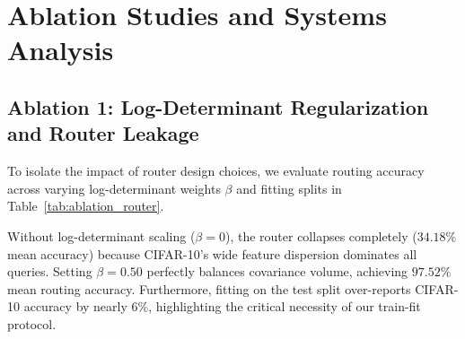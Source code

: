 \documentclass[11pt, a4paper]{article}
\begin{document}
\section{Ablation Studies and Systems Analysis}
\label{sec:ablations}

\subsection{Ablation 1: Log-Determinant Regularization and Router Leakage}

To isolate the impact of router design choices, we evaluate routing accuracy across varying log-determinant weights $\beta$ and fitting splits in Table~\ref{tab:ablation_router}.

\begin{table}[h]
\centering
\caption{\textbf{Router Calibration Ablation: Log-Determinant Weight $\beta$ and Fitting Split.} Evaluated on Stage 3 representations.}
\label{tab:ablation_router}
\small
{}
\end{table}

Without log-determinant scaling ($\beta = 0$), the router collapses completely ($34.18\%$ mean accuracy) because CIFAR-10's wide feature dispersion dominates all queries. Setting $\beta = 0.50$ perfectly balances covariance volume, achieving $97.52\%$ mean routing accuracy. Furthermore, fitting on the test split over-reports CIFAR-10 accuracy by nearly $6\%$, highlighting the critical necessity of our train-fit protocol.
\end{document}

